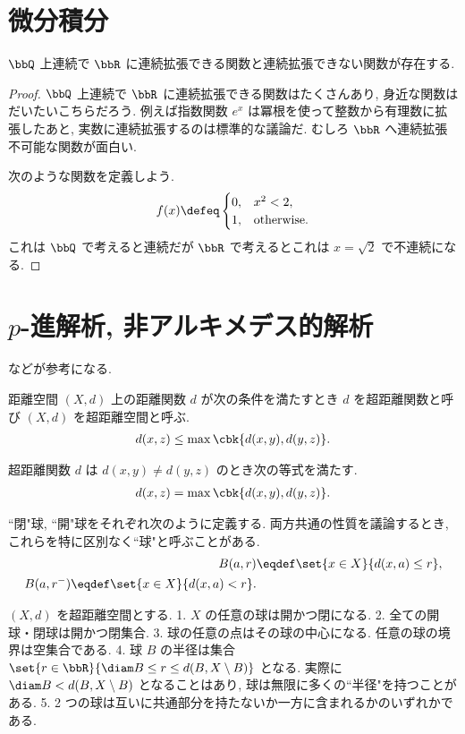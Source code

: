 \documentclass[openany, a4paper, oneside]{jsbook}
\begin{document}
\section{微分積分}

\begin{ex}
$\bbQ$ 上連続で $\bbR$ に連続拡張できる関数と連続拡張できない関数が存在する.
\end{ex}
\begin{proof}
$\bbQ$ 上連続で $\bbR$ に連続拡張できる関数はたくさんあり, 身近な関数はだいたいこちらだろう.
例えば指数関数 $e^x$ は冪根を使って整数から有理数に拡張したあと, 実数に連続拡張するのは標準的な議論だ.
むしろ $\bbR$ へ連続拡張不可能な関数が面白い.

次のような関数を定義しよう.
\begin{align}
 f(x)
 \defeq
 \begin{cases}
  0, & x^2 < 2, \\
  1, & \text{otherwise}.
 \end{cases}
\end{align}
これは $\bbQ$ で考えると連続だが $\bbR$ で考えるとこれは $x = \sqrt{2}$ で不連続になる.
\end{proof}
\section{$p$-進解析, 非アルキメデス的解析}

\cite{Kenkichiiwasawa1, WHSchikhof1} などが参考になる.
\begin{defn}
距離空間 $(X, d)$ 上の距離関数 $d$ が次の条件を満たすとき
$d$ を超距離関数と呼び $(X, d)$ を超距離空間と呼ぶ.
\begin{align}
 d(x, z)
 \leq
 \max \cbk{d(x,y), d(y,z)}.
\end{align}
\end{defn}
超距離関数 $d$ は $d(x,y) \neq d(y,z)$ のとき次の等式を満たす.
\begin{align}
 d(x, z)
 =
 \max \cbk{d(x,y), d(y,z)}.
\end{align}

``閉"球, ``開"球をそれぞれ次のように定義する.
両方共通の性質を議論するとき, これらを特に区別なく``球"と呼ぶことがある.
\begin{align}
 B(a,r)
 &\eqdef
 \set{x \in X}{d(x, a) \leq r}, \\
 B(a, r^{-})
 \eqdef
 \set{x \in X}{d(x, a) < r}.
\end{align}
\begin{prop}
$(X, d)$ を超距離空間とする.
1. $X$ の任意の球は開かつ閉になる.
2. 全ての開球・閉球は開かつ閉集合.
3. 球の任意の点はその球の中心になる.
   任意の球の境界は空集合である.
4. 球 $B$ の半径は集合 $\set{r \in \bbR}{\diam B \leq r \leq d(B, X \setminus B)}$ となる.
   実際に $\diam B < d(B, X \setminus B)$ となることはあり, 球は無限に多くの``半径"を持つことがある.
5. 2 つの球は互いに共通部分を持たないか一方に含まれるかのいずれかである.
\end{prop}
\end{document}
